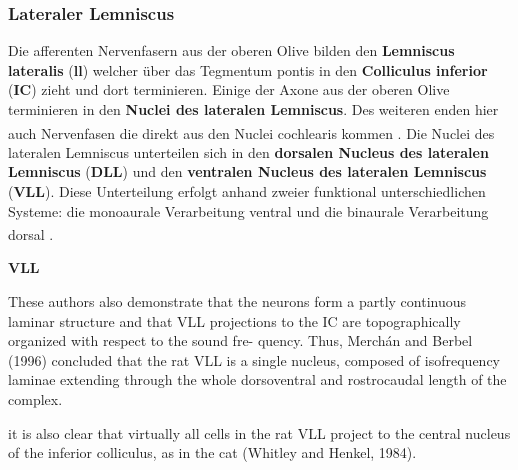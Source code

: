 \documentclass[12pt,a4paper,pdftex]{article}
\begin{document}
\subsubsection*{Lateraler Lemniscus}

Die afferenten Nervenfasern aus der oberen Olive bilden den \textbf{Lemniscus lateralis} (\textbf{ll}) welcher über das Tegmentum pontis in den \textbf{Colliculus inferior} (\textbf{IC}) zieht und dort terminieren. Einige der Axone aus der oberen Olive terminieren in den \textbf{Nuclei des lateralen Lemniscus}. Des weiteren enden hier auch Nervenfasen die direkt aus den Nuclei cochlearis kommen \textsuperscript{\cite[10]{crossman2014neuroanatomy}}. 
Die Nuclei des lateralen Lemniscus unterteilen sich in den \textbf{dorsalen Nucleus des lateralen Lemniscus} (\textbf{DLL}) und den \textbf{ventralen Nucleus des lateralen Lemniscus} (\textbf{VLL}). Diese Unterteilung erfolgt anhand zweier funktional unterschiedlichen Systeme: die monoaurale Verarbeitung ventral und die binaurale Verarbeitung dorsal \textsuperscript{\cite[29]{paxinos2014rat}}. 

\textbf{VLL}


These authors also
demonstrate that the neurons form a partly continuous
laminar structure and that VLL projections to the IC are
topographically organized with respect to the sound fre-
quency. Thus, Merchán and Berbel (1996) concluded that
the rat VLL is a single nucleus, composed of isofrequency
laminae extending through the whole dorsoventral and
rostrocaudal length of the complex.

it is also clear that virtually all cells in the rat VLL
project to the central nucleus of the inferior colliculus, as
in the cat (Whitley and Henkel, 1984).
\end{document}
